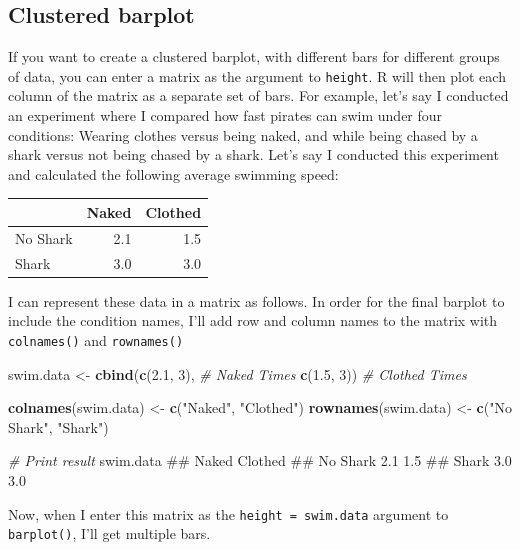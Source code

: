 \documentclass[]{book}
\newenvironment{Shaded}{\begin{snugshade}}{\end{snugshade}}
\newcommand{\KeywordTok}[1]{\textcolor[rgb]{0.13,0.29,0.53}{\textbf{#1}}}
\newcommand{\DecValTok}[1]{\textcolor[rgb]{0.00,0.00,0.81}{#1}}
\newcommand{\FloatTok}[1]{\textcolor[rgb]{0.00,0.00,0.81}{#1}}
\newcommand{\StringTok}[1]{\textcolor[rgb]{0.31,0.60,0.02}{#1}}
\newcommand{\CommentTok}[1]{\textcolor[rgb]{0.56,0.35,0.01}{\textit{#1}}}
\newcommand{\NormalTok}[1]{#1}
\theoremstyle{definition}
\theoremstyle{definition}
\theoremstyle{remark}
\begin{document}
\subsection{Clustered barplot}\label{clustered-barplot}

If you want to create a clustered barplot, with different bars for
different groups of data, you can enter a matrix as the argument to
\texttt{height}. R will then plot each column of the matrix as a
separate set of bars. For example, let's say I conducted an experiment
where I compared how fast pirates can swim under four conditions:
Wearing clothes versus being naked, and while being chased by a shark
versus not being chased by a shark. Let's say I conducted this
experiment and calculated the following average swimming speed:

\begin{tabular}{l|r|r}
\hline
  & Naked & Clothed\\
\hline
No Shark & 2.1 & 1.5\\
\hline
Shark & 3.0 & 3.0\\
\hline
\end{tabular}

I can represent these data in a matrix as follows. In order for the
final barplot to include the condition names, I'll add row and column
names to the matrix with \texttt{colnames()} and \texttt{rownames()}

\begin{Shaded}
\begin{Highlighting}[]
\NormalTok{swim.data <-}\StringTok{ }\KeywordTok{cbind}\NormalTok{(}\KeywordTok{c}\NormalTok{(}\FloatTok{2.1}\NormalTok{, }\DecValTok{3}\NormalTok{), }\CommentTok{# Naked Times}
                   \KeywordTok{c}\NormalTok{(}\FloatTok{1.5}\NormalTok{, }\DecValTok{3}\NormalTok{)) }\CommentTok{# Clothed Times}

\KeywordTok{colnames}\NormalTok{(swim.data) <-}\StringTok{ }\KeywordTok{c}\NormalTok{(}\StringTok{"Naked"}\NormalTok{, }\StringTok{"Clothed"}\NormalTok{)}
\KeywordTok{rownames}\NormalTok{(swim.data) <-}\StringTok{ }\KeywordTok{c}\NormalTok{(}\StringTok{"No Shark"}\NormalTok{, }\StringTok{"Shark"}\NormalTok{)}

\CommentTok{# Print result}
\NormalTok{swim.data}
\NormalTok{##          Naked Clothed}
\NormalTok{## No Shark   2.1     1.5}
\NormalTok{## Shark      3.0     3.0}
\end{Highlighting}
\end{Shaded}

Now, when I enter this matrix as the \texttt{height\ =\ swim.data}
argument to \texttt{barplot()}, I'll get multiple bars.
\end{document}
